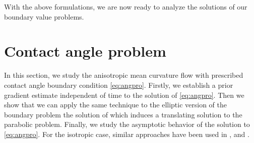 \documentclass[12pt]{article}
\numberwithin{equation}{section}
\theoremstyle{plain}
\theoremstyle{definition}
\theoremstyle{remark}
\begin{document}
With the above formulations, we are now ready to analyze the solutions of our boundary value problems.

\section{Contact angle problem} \label{sec:3}
In this section, we study the anisotropic mean curvature flow with prescribed contact angle boundary condition \eqref{eq:angpro}. Firstly, we establish a prior gradient estimate independent of time to the solution of \eqref{eq:angpro}. Then we show that we can apply the same technique to the elliptic version of the boundary problem the solution of which induces a translating solution to the parabolic problem. Finally, we study the asymptotic behavior of the solution to \eqref{eq:angpro}. For the isotropic case, similar approaches have been used in \cite{AW2}, \cite{MWW} and \cite{GMWW}. 
\end{document}
